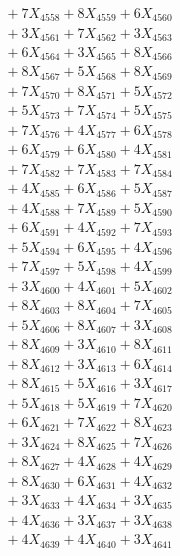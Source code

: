 \documentclass[a4paper,10pt]{article}
\begin{document}
{\begin{align}
&\;  + 7 X_{4558} + 8 X_{4559} + 6 X_{4560} \\[0.3ex]
&\;  + 3 X_{4561} + 7 X_{4562} + 3 X_{4563} \\[0.3ex]
&\;  + 6 X_{4564} + 3 X_{4565} + 8 X_{4566} \\[0.3ex]
&\;  + 8 X_{4567} + 5 X_{4568} + 8 X_{4569} \\[0.5ex]\allowbreak
&\;  + 7 X_{4570} + 8 X_{4571} + 5 X_{4572} \\[0.3ex]
&\;  + 5 X_{4573} + 7 X_{4574} + 5 X_{4575} \\[0.3ex]
&\;  + 7 X_{4576} + 4 X_{4577} + 6 X_{4578} \\[0.3ex]
&\;  + 6 X_{4579} + 6 X_{4580} + 4 X_{4581} \\[0.3ex]
&\;  + 7 X_{4582} + 7 X_{4583} + 7 X_{4584} \\[0.3ex]
&\;  + 4 X_{4585} + 6 X_{4586} + 5 X_{4587} \\[0.3ex]
&\;  + 4 X_{4588} + 7 X_{4589} + 5 X_{4590} \\[0.3ex]
&\;  + 6 X_{4591} + 4 X_{4592} + 7 X_{4593} \\[0.3ex]
&\;  + 5 X_{4594} + 6 X_{4595} + 4 X_{4596} \\[0.3ex]
&\;  + 7 X_{4597} + 5 X_{4598} + 4 X_{4599} \\[0.5ex]\allowbreak
&\;  + 3 X_{4600} + 4 X_{4601} + 5 X_{4602} \\[0.3ex]
&\;  + 8 X_{4603} + 8 X_{4604} + 7 X_{4605} \\[0.3ex]
&\;  + 5 X_{4606} + 8 X_{4607} + 3 X_{4608} \\[0.3ex]
&\;  + 8 X_{4609} + 3 X_{4610} + 8 X_{4611} \\[0.3ex]
&\;  + 8 X_{4612} + 3 X_{4613} + 6 X_{4614} \\[0.3ex]
&\;  + 8 X_{4615} + 5 X_{4616} + 3 X_{4617} \\[0.3ex]
&\;  + 5 X_{4618} + 5 X_{4619} + 7 X_{4620} \\[0.3ex]
&\;  + 6 X_{4621} + 7 X_{4622} + 8 X_{4623} \\[0.3ex]
&\;  + 3 X_{4624} + 8 X_{4625} + 7 X_{4626} \\[0.3ex]
&\;  + 8 X_{4627} + 4 X_{4628} + 4 X_{4629} \\[0.5ex]\allowbreak
&\;  + 8 X_{4630} + 6 X_{4631} + 4 X_{4632} \\[0.3ex]
&\;  + 3 X_{4633} + 4 X_{4634} + 3 X_{4635} \\[0.3ex]
&\;  + 4 X_{4636} + 3 X_{4637} + 3 X_{4638} \\[0.3ex]
&\;  + 4 X_{4639} + 4 X_{4640} + 3 X_{4641} \\[0.3ex]

\end{align}}
\end{document}
